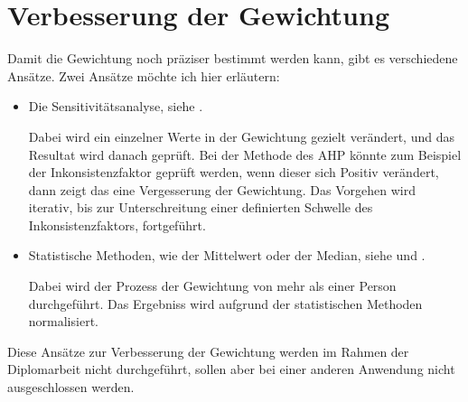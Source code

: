   \section{Verbesserung der 
  Gewichtung}\label{subsection:VerbesserungDerGewichtung}
  
  Damit die Gewichtung noch präziser bestimmt werden kann, gibt es verschiedene
  Ansätze. Zwei Ansätze möchte ich hier erläutern:
  
  \begin{itemize}
    \item Die Sensitivitätsanalyse, siehe \cite{Sensitivitaetsanalyse}.
    
    Dabei wird ein einzelner Werte in der Gewichtung gezielt verändert, und das
    Resultat wird danach geprüft. Bei der Methode des \ac{AHP} könnte zum
    Beispiel der Inkonsistenzfaktor geprüft werden, wenn dieser sich Positiv
    verändert, dann zeigt das eine Vergesserung der Gewichtung. Das Vorgehen
    wird iterativ, bis zur Unterschreitung einer definierten Schwelle des
    Inkonsistenzfaktors, fortgeführt.
    
    \item Statistische Methoden, wie der Mittelwert oder der Median, siehe
    \cite{Median} und \cite{Mittelwert}.
    
    Dabei wird der Prozess der Gewichtung von mehr als einer Person
    durchgeführt. Das Ergebniss wird aufgrund der statistischen Methoden
    normalisiert.
  \end{itemize}
  
  \noindent
  Diese Ansätze zur Verbesserung der Gewichtung werden im Rahmen der
  Diplomarbeit nicht durchgeführt, sollen aber bei einer anderen Anwendung
  nicht ausgeschlossen werden.

